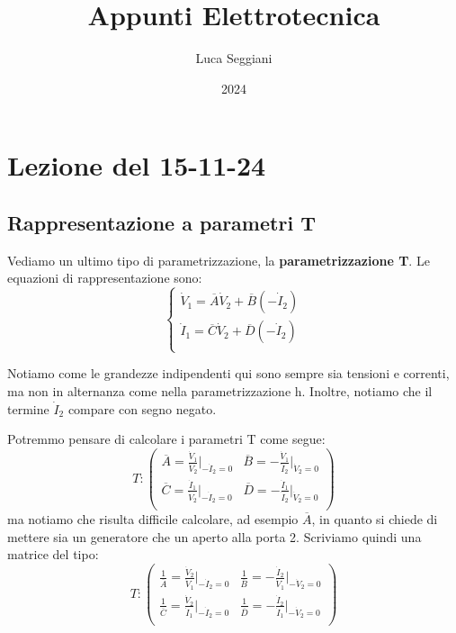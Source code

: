 \documentclass[a4paper,11pt]{article}
\title{Appunti Elettrotecnica}
\author{Luca Seggiani}
\date{2024}
\begin{document}
\section{Lezione del 15-11-24}

\thispagestyle{empty}
\pagestyle{fancy}

\subsection{Rappresentazione a parametri T}
Vediamo un ultimo tipo di parametrizzazione, la \textbf{parametrizzazione T}.
Le equazioni di rappresentazione sono:
\[
	\begin{cases}
		\dot{V}_1	= \overline{A} \dot{V}_2 + \overline{B} ( - \dot{I}_2 ) \\ 
		\dot{I}_1	= \overline{C} \dot{V}_2 + \overline{D} ( - \dot{I}_2 ) \\ 
	\end{cases}
\]

Notiamo come le grandezze indipendenti qui sono sempre sia tensioni e correnti, ma non in alternanza come nella parametrizzazione h.
Inoltre, notiamo che il termine $\dot{I}_2$ compare con segno negato.

Potremmo pensare di calcolare i parametri T come segue:
$$
T:
\begin{pmatrix}
	\overline{A} = \frac{\dot{V}_1}{\dot{V}_2} \Big|_{-\dot{I}_2 = 0}	& \overline{B} = -\frac{\dot{V}_1}{\dot{I}_2} \Big|_{\dot{V}_2 = 0} \\
	\overline{C} = \frac{\dot{I}_1}{\dot{V}_2} \Big|_{-\dot{I}_2 = 0}	& \overline{D} = -\frac{\dot{I}_1}{\dot{I}_2} \Big|_{\dot{V}_2 = 0} \\
\end{pmatrix}
$$
ma notiamo che risulta difficile calcolare, ad esempio $\overline{A}$, in quanto si chiede di mettere sia un generatore che un aperto alla porta 2. 
Scriviamo quindi una matrice del tipo:
$$
T:
\begin{pmatrix}
	\frac{1}{\overline{A}} = \frac{\dot{V}_2}{\dot{V}_1} \Big|_{- \dot{I}_2 = 0} & \frac{1}{\overline{B}} = -\frac{\dot{I}_2}{\dot{V}_1} \Big|_{- \dot{V}_2 = 0} \\
	\frac{1}{\overline{C}} = \frac{\dot{V}_2}{\dot{I}_1} \Big|_{- \dot{I}_2 = 0} & \frac{1}{\overline{D}} = -\frac{\dot{I}_2}{\dot{I}_1} \Big|_{- \dot{V}_2 = 0} \\
\end{pmatrix}
$$
\end{document}
